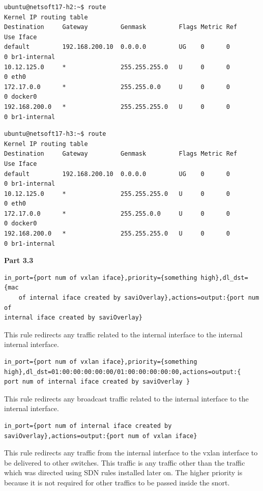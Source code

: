 \documentclass[12pt]{article}
\begin{document}
\begin{verbatim}
ubuntu@netsoft17-h2:~$ route
Kernel IP routing table
Destination     Gateway         Genmask         Flags Metric Ref    Use Iface
default         192.168.200.10  0.0.0.0         UG    0      0        0 br1-internal
10.12.125.0     *               255.255.255.0   U     0      0        0 eth0
172.17.0.0      *               255.255.0.0     U     0      0        0 docker0
192.168.200.0   *               255.255.255.0   U     0      0        0 br1-internal
\end{verbatim}

\begin{verbatim}
ubuntu@netsoft17-h3:~$ route
Kernel IP routing table
Destination     Gateway         Genmask         Flags Metric Ref    Use Iface
default         192.168.200.10  0.0.0.0         UG    0      0        0 br1-internal
10.12.125.0     *               255.255.255.0   U     0      0        0 eth0
172.17.0.0      *               255.255.0.0     U     0      0        0 docker0
192.168.200.0   *               255.255.255.0   U     0      0        0 br1-internal
\end{verbatim}


\vspace{5mm} 
\textbf{Part 3.3}

\begin{verbatim}
in_port={port num of vxlan iface},priority={something high},dl_dst={mac
	of internal iface created by saviOverlay},actions=output:{port num of
internal iface created by saviOverlay}
\end{verbatim}

This rule redirects any traffic related to the internal interface to the internal
internal interface.

\begin{verbatim}
in_port={port num of vxlan iface},priority={something
high},dl_dst=01:00:00:00:00:00/01:00:00:00:00:00,actions=output:{
port num of internal iface created by saviOverlay }
\end{verbatim}

This rule redirects any broadcast traffic related to the internal interface to the internal interface.

\begin{verbatim}
in_port={port num of internal iface created by saviOverlay},actions=output:{port num of vxlan iface}
\end{verbatim}

This rule redirects any traffic from the internal interface to the vxlan interface
to be delivered to other switches. This traffic is any traffic other than the
traffic which was directed using SDN rules installed later on. The higher priority
is because it is not required for other traffics to be passed inside the snort.
\end{document}
